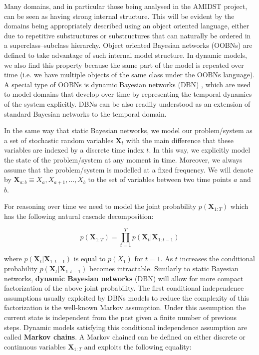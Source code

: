 Many domains, and in particular those being analysed in the AMIDST project, can be seen as having strong internal structure. This will be evident by the domains being appropriately described using an object oriented language, either due to repetitive substructures or substructures that can naturally be ordered in a superclass–subclass hierarchy.  Object oriented Bayesian networks \cite{KollerPfeffer1997} (OOBNs) are defined to take advantage of such internal model structure. In dynamic models, we also find this property because the same part of the model is repeated over time (i.e. we have multiple objects of the same class under the OOBNs language). A special type of OOBNs is dynamic Bayesian networks (DBN) \cite{DeanKanazawa1989}, which are used to model domains that develop over time by representing the temporal dynamics of the system explicitly. DBNs can be also readily understood as an extension of standard Bayesian networks to the temporal domain. 


In the same way that static Bayesian networks, we model our problem/system as a set of stochastic random variables $\bm X_t$ with the main difference that these variables are indexed by a discrete time index $t$. In this way,  we explicitly model the state of the problem/system at any moment in time. Moreover,  we always assume that the problem/system is modelled at a fixed frequency. We will denote by $\bm X_{a:b} \equiv X_a,X_{a+1},\ldots,X_{b}$ to the set of variables between two time points $a$ and $b$.  

For reasoning over time we need to model the joint probability $p(\bm X_{1:T})$ which has the following natural cascade decomposition:

$$p(\bm X_{1:T})  = \prod_{t=1}^T p(\bm X_t|\bm X_{1:t-1})$$

\noindent where $p(\bm X_t|\bm X_{1:t-1})$ is equal to $p(X_1)$ for $t=1$. As $t$ increases the conditional probability $p(\bm X_t|\bm X_{1:t-1})$ becomes intractable. Similarly to static Bayesian networks, \textbf{dynamic Bayesian networks} (DBN) will allow for more compact factorization of the above joint probability. The first conditional independence assumptions usually  exploited by DBNs models to reduce the complexity of this factorization is the well-known Markov assumption. Under this assumption the current state is independent from the past given a finite number of previous steps.  Dynamic models satisfying this conditional independence assumption are called \textbf{Markov chains}. A Markov chained can be defined on either discrete or continuous variables $\bm X_{1:T}$ and exploits the following equality:

